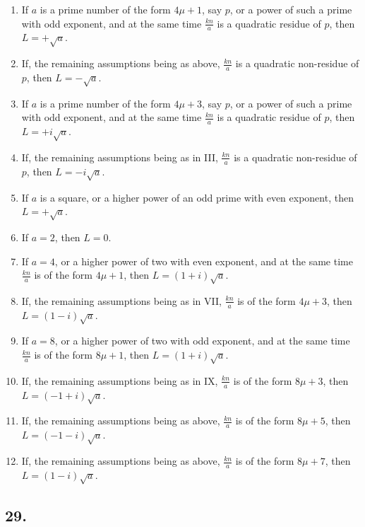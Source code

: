 \documentclass[12pt]{article}
\begin{document}
\begin{enumerate}[label=\Roman*.,leftmargin=2.5em]
\item If $a$ is a prime number of the form $4\mu+1$, say $p$, or a power of such a prime with odd exponent, and at the same time $\frac{kn}{a}$ is a quadratic residue of $p$, then $L=+\sqrt a$.
\item If, the remaining assumptions being as above, $\frac{kn}{a}$ is a quadratic non-residue of $p$, then $L=-\sqrt a$.
\item If $a$ is a prime number of the form $4\mu+3$, say $p$, or a power of such a prime with odd exponent, and at the same time $\frac{kn}{a}$ is a quadratic residue of $p$, then $L=+i\sqrt a$.
\item If, the remaining assumptions being as in III, $\frac{kn}{a}$ is a quadratic non-residue of $p$, then $L=-i\sqrt a$.
\item If $a$ is a square, or a higher power of an odd prime with even exponent, then $L=+\sqrt a$.
\item If $a=2$, then $L=0$.
\item If $a=4$, or a higher power of two with even exponent, and at the same time $\frac{kn}{a}$ is of the form $4\mu+1$, then $L=(1+i)\sqrt a$.
\item If, the remaining assumptions being as in VII, $\frac{kn}{a}$ is of the form $4\mu+3$, then $L=(1-i)\sqrt a$.
\item If $a=8$, or a higher power of two with odd exponent, and at the same time $\frac{kn}{a}$ is of the form $8\mu+1$, then $L=(1+i)\sqrt a$.
\item If, the remaining assumptions being as in IX, $\frac{kn}{a}$ is of the form $8\mu+3$, then $L=(-1+i)\sqrt a$.
\item If, the remaining assumptions being as above, $\frac{kn}{a}$ is of the form $8\mu+5$, then $L=(-1-i)\sqrt a$.
\item If, the remaining assumptions being as above, $\frac{kn}{a}$ is of the form $8\mu+7$, then $L=(1-i)\sqrt a$.
\end{enumerate}

\subsection*{29.}
\end{document}
